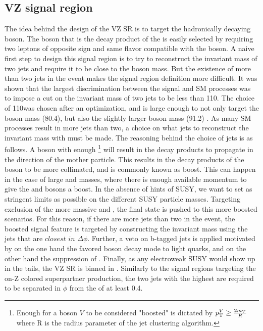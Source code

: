 \subsection*{VZ signal region}
\noindent
\justify
The idea behind the design of the VZ SR is to target the hadronically decaying \PW boson.
The \PZ boson that is the decay product of the \PSGczDt is easily selected by requiring two leptons of opposite sign and same flavor compatible with the \PZ boson.
A naive first step to design this signal region is to try to reconstruct the invariant mass of two jets and require it to be close to the \PW boson mass.
But the existence of more than two jets in the event makes the signal region definition more difficult.  
It was shown that the largest discrimination between the signal and SM processes was to impose a cut on the invariant mass of two jets to be less than 110\GeV.
The choice of 110\GeV was chosen after an optimization, and is large enough to not only target the \PW boson mass (80.4\GeV), but also the slightly larger \PZ boson mass (91.2\GeV) \cite{PhysRevD.98.030001}. 
As many SM processes result in more jets than two, a choice on what jets to reconstruct the invariant mass with must be made.
The reasoning behind the choice of jets is as follows. 
A \PW boson with enough \pt\footnote{Enough \pt for a boson $V$ to be considered "boosted" is dictated by $p_{\mathrm{T}}^{V}\geq\frac{2m_{V}}{R}$ where R is the radius parameter of the jet clustering algorithm.} will result in the decay products to propagate in the direction of the mother particle.  
This results in the decay products of the \PW boson to be more collimated, and is commonly known as boost.
This can happen in the case of large \PSGczDt and \firstcharg masses, where there is enough available momentum to give the \PZ and \PW bosons a boost.
In the absence of hints of SUSY, we want to set as stringent limits as possible on the different SUSY particle masses. 
Targeting exclusion of the more massive \PSGczDt and \firstcharg, the final state is pushed to this more boosted scenarios.
For this reason, if there are more jets than two in the event, the boosted signal feature is targeted by constructing the invariant mass using the jets that are $closest$ $in$ $\Delta\phi$.
\newpara
\noindent\justify
Further, a veto on b-tagged jets is applied motivated by on the one hand the favored \PW boson decay mode to light quarks, and on the other hand the suppression of \ttbar. 
Finally, as any electroweak SUSY would show up in the \ptmiss tails, the VZ SR is binned in \ptmiss. 
Similarly to the signal regions targeting the on-Z colored superpartner production, the two jets with the highest \pt are required to be separated in $\phi$ from the \ptmiss of at least 0.4.
